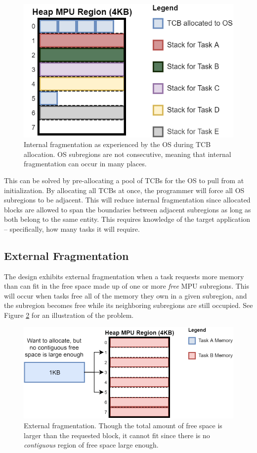 \begin{figure}[hbtp]
	\centering
	\includegraphics[width=0.7\linewidth]{figs/OS_int_frag.png}
	\caption{Internal fragmentation as experienced by the OS during TCB allocation. OS subregions are not consecutive, meaning that internal fragmentation can occur in many places.}
	\label{fig:internal_frag}
\end{figure}

This can be solved by pre-allocating a pool of TCBs for the OS to pull from at initialization. By allocating all TCBs at once, the programmer will force all OS subregions to be adjacent. This will reduce internal fragmentation since allocated blocks are allowed to span the boundaries between adjacent subregions as long as both belong to the same entity. This requires knowledge of the target application -- specifically, how many tasks it will require.

\subsection{External Fragmentation}

The design exhibits external fragmentation when a task requests more memory than can fit in the free space made up of one or more \textit{free} MPU subregions. This will occur when tasks free all of the memory they own in a given subregion, and the subregion becomes free while its neighboring subregions are still occupied. See Figure \ref{fig:external_frag} for an illustration of the problem.

\begin{figure}[hbtp]
	\centering
	\includegraphics[width=0.7\linewidth]{figs/ext_frag.png}
	\caption{External fragmentation. Though the total amount of free space is larger than the requested block, it cannot fit since there is no \textit{contiguous} region of free space large enough.}
	\label{fig:external_frag}
\end{figure}


